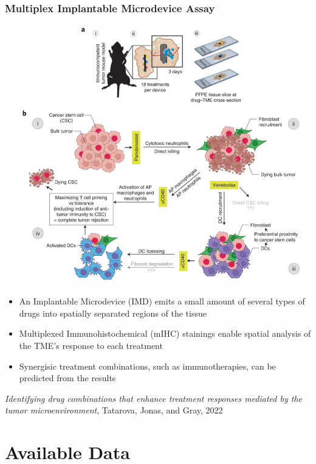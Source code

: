\documentclass{beamer}
\begin{document}
\begin{frame}
  \frametitle{Multiplex Implantable Microdevice Assay}
      \includegraphics[width=\linewidth]{figs/TME_example.png}
    \endminipage\hfill
      \begin{itemize}
	\item An Implantable Microdevice (IMD) emits a small amount of several types of drugs into spatially separated regions of the tissue 
	\item Multiplexed Immunohistochemical (mIHC) stainings enable spatial analysis of the TME's response to each treatment 
	\item Synergisic treatment combinations, such as immunotherapies, can be predicted from the results
      \end{itemize}
    \endminipage\vfill
    \small{\textit{Identifying drug combinations that enhance treatment responses mediated by the tumor microenvironment}, Tatarova, Jonas, and Gray, 2022}~\cite{MIMA-Gray-2022}
\end{frame}
 


\section{Available Data}
\end{document}
